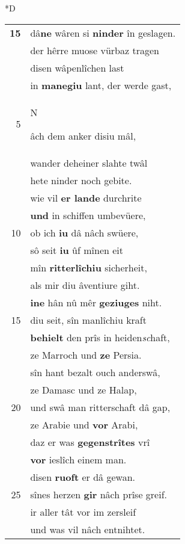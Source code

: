 \documentclass[8pt,a4paper,notitlepage]{article}
\begin{document}
\begin{table}[ht]
\begin{minipage}[t]{0.5\linewidth}
\small
\begin{center}*D
\end{center}
\begin{tabular}{rl}
\textbf{15} & dâ\textbf{ne} wâren si \textbf{ninder} în geslagen.\\ 
 & der hêrre muose vürbaz tragen\\ 
 & disen wâpenlîchen last\\ 
 & in \textbf{manegiu} lant, der werde gast,\\ 
5 & \begin{large}N\end{large}âch dem anker disiu mâl,\\ 
 & wander deheiner slahte twâl\\ 
 & hete ninder noch gebite.\\ 
 & wie vil \textbf{er lande} durchrite\\ 
 & \textbf{und} in schiffen umbevüere,\\ 
10 & ob ich \textbf{iu} dâ nâch swüere,\\ 
 & sô seit \textbf{iu} ûf mînen eit\\ 
 & mîn \textbf{ritterlîchiu} sicherheit,\\ 
 & als mir diu âventiure giht.\\ 
 & \textbf{i}\textbf{ne} hân nû mêr \textbf{geziuges} niht.\\ 
15 & diu seit, sîn manlîchiu kraft\\ 
 & \textbf{behielt} den prîs in heiden\textit{sc}haft,\\ 
 & ze Marroch und \textbf{ze} Persia.\\ 
 & sîn hant bezalt ouch anderswâ,\\ 
 & ze Damasc und ze Halap,\\ 
20 & und swâ man ritterschaft dâ gap,\\ 
 & ze Arabie und \textbf{vor} Arabi,\\ 
 & daz er was \textbf{gegenstrîtes} vrî\\ 
 & \textbf{vor} ieslîch einem man.\\ 
 & disen \textbf{ruoft} er dâ gewan.\\ 
25 & sînes herzen \textbf{gir} nâch prîse greif.\\ 
 & ir aller tât vor im zersleif\\ 
 & und was vil nâch entnihtet.\\ 

\end{tabular}
\end{minipage}
\end{table}
\end{document}
